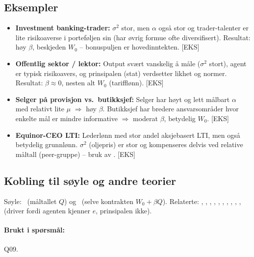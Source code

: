 \subsection*{Eksempler}
\begin{itemize}\setlength{\itemsep}{2pt}
\item \textbf{Investment banking-trader:} $\sigma^{2}$ stor, men $\alpha$ også stor og trader-talenter er lite risikoaverse i porteføljen sin (har øvrig formue ofte diversifisert). Resultat: høy $\beta$, beskjeden $W_0$ -- bonuspuljen er hovedinntekten. [EKS]
\item \textbf{Offentlig sektor / lektor:} Output svært vanskelig å måle ($\sigma^{2}$ stort), agent er typisk risikoavers, og prinsipalen (stat) verdsetter likhet og normer. Resultat: $\beta\approx 0$, nesten alt $W_0$ (tarifflønn). [EKS]
\item \textbf{Selger på provisjon vs.\ butikksjef:} Selger har høyt og lett målbart $\alpha$ med relativt lite $\mu$ $\Rightarrow$ høy $\beta$. Butikksjef har bredere ansvarsområder hvor enkelte mål er mindre informative $\Rightarrow$ moderat $\beta$, betydelig $W_0$. [EKS]
\item \textbf{Equinor-CEO LTI:} Lederlønn med stor andel aksjebasert LTI, men også betydelig grunnlønn. $\sigma^{2}$ (oljepris) er stor og kompenseres delvis ved relative måltall (peer-gruppe) -- bruk av . [EKS]
\end{itemize}

\subsection*{Kobling til søyle og andre teorier}
Søyle: \STwo\ (måltallet $Q$) og \SThree\ (selve kontrakten $W_0+\beta Q$). Relaterte: , , , , , , , , , ,  (driver fordi agenten kjenner $e$, prinsipalen ikke).

\paragraph{Brukt i spørsmål:} Q09.
